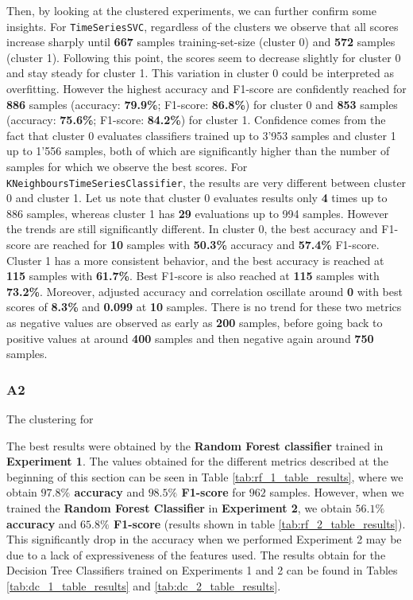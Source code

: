 \documentclass[sigplan,screen]{acmart}
\begin{document}
Then, by looking at the clustered experiments, we can further confirm some insights.
For \texttt{TimeSeriesSVC}, regardless of the clusters we observe that all scores increase sharply until \textbf{667} samples training-set-size (cluster 0) and \textbf{572} samples (cluster 1). Following this point, the scores seem to decrease slightly for cluster 0 and stay steady for cluster 1. This variation in cluster 0 could be interpreted as overfitting. However the highest accuracy and F1-score are confidently reached for \textbf{886} samples (accuracy: \textbf{79.9\%}; F1-score: \textbf{86.8\%}) for cluster 0 and \textbf{853} samples (accuracy: \textbf{75.6\%}; F1-score: \textbf{84.2\%}) for cluster 1. Confidence comes from the fact that cluster 0 evaluates classifiers trained up to 3’953 samples and cluster 1 up to 1’556 samples, both of which are significantly higher than the number of samples for which we observe the best scores.
For \texttt{KNeighboursTimeSeriesClassifier}, the results are very different between cluster 0 and cluster 1. Let us note that cluster 0 evaluates results only \textbf{4} times up to 886 samples, whereas cluster 1 has \textbf{29} evaluations up to 994 samples. However the trends are still significantly different. 
In cluster 0, the best accuracy and F1-score are reached for \textbf{10} samples with \textbf{50.3\%} accuracy and \textbf{57.4\%} F1-score.
Cluster 1 has a more consistent behavior, and the best accuracy is reached at \textbf{115} samples with \textbf{61.7\%}. Best F1-score is also reached at \textbf{115} samples with \textbf{73.2\%}. Moreover, adjusted accuracy and correlation oscillate around \textbf{0} with best scores of \textbf{8.3\%} and \textbf{0.099} at \textbf{10} samples. There is no trend for these two metrics as negative values are observed as early as \textbf{200} samples, before going back to positive values at around \textbf{400} samples and then negative again around \textbf{750} samples.

\subsubsection{A2}

The clustering for 

The best results were obtained by the \textbf{Random Forest classifier} trained in \textbf{Experiment 1}. The values obtained for the different metrics described at the beginning of this section can be seen in Table \ref{tab:rf_1_table_results}, where we obtain \textbf{$97.8\%$ accuracy} and \textbf{$98.5\%$ F1-score} for $962$ samples. However, when we trained the \textbf{Random Forest Classifier} in \textbf{Experiment 2}, we obtain \textbf{$56.1\%$ accuracy} and \textbf{$65.8\%$ F1-score} (results shown in table \ref{tab:rf_2_table_results}). This significantly drop in the accuracy when we performed Experiment 2 may be due to a lack of expressiveness of the features used. The results obtain for the Decision Tree Classifiers trained on Experiments 1 and 2 can be found in Tables \ref{tab:dc_1_table_results} and \ref{tab:dc_2_table_results}.
\end{document}
